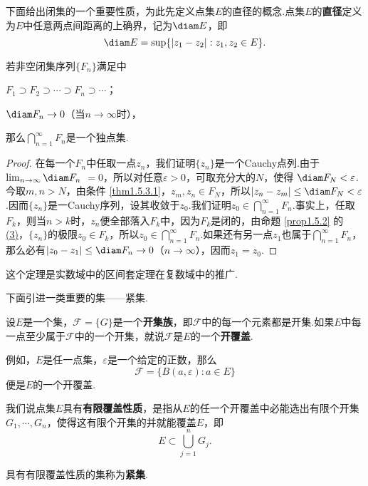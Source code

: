 下面给出闭集的一个重要性质，为此先定义点集$E$的直径的概念.点集$E$的\textbf{直径}定义为$E$中任意两点间距离的上确界，记为$\diam E$，即
\[\diam E=\sup\{|z_1-z_2|:z_1,z_2\in E\}.\]

\begin{theorem}\label{thm1.5.3}
  若非空闭集序列$\{F_n\}$满足中
  \begin{eenum}
    \item \label{thm1.5.3.1} $F_1\supset F_2\supset\cdots\supset F_n\supset\cdots$；
    \item \label{thm1.5.3.2} $\diam F_n\to 0$（当$n\to\infty$时），
  \end{eenum}
  那么$\bigcap_{n=1}^\infty F_n$是一个独点集.
\end{theorem}
\begin{proof}
在每一个$F_n$中任取一点$z_n$，我们证明$\{z_n\}$是一个Cauchy点列.由于$\lim_{n\to\infty}\diam F_n$ $=0$，所以对任意$\varepsilon>0$，可取充分大的$N$，使得 $\diam F_N<\varepsilon$.今取$m,n>N$，由条件 \ref{thm1.5.3.1}，$z_m,z_n\in F_N$，所以$|z_n-z_m|\le\diam F_N<\varepsilon$.因而$\{z_n\}$是一Cauchy序列，设其收敛于$z_0$.我们证明$z_0\in\bigcap_{n=1}^\infty F_n$.事实上，任取$F_k$，则当$n>k$时，$z_n$便全部落入$F_k$中，因为$F_k$是闭的，由命题 \ref{prop1.5.2} 的 \hyperlink{prop1.5.2.3}{(3)}，$\{z_n\}$的极限$z_0\in F_k$，所以$z_0\in\bigcap_{n=1}^\infty F_n$.如果还有另一点$z_1$也属于$\bigcap_{n=1}^\infty F_n$，那么必有$|z_0-z_1|\le\diam F_n\to0$（$n\to\infty$），因而$z_1=z_0$.
\end{proof}

这个定理是实数域中的区间套定理在复数域中的推广.

下面引进一类重要的集——紧集.

设$E$是一个集，$\mathscr F=\{G\}$是一个\textbf{开集族}，即$\mathscr F$中的每一个元素都是开集.如果$E$中每一点至少属于$\mathscr F$中的一个开集，就说$\mathscr F$是$E$的一个\textbf{开覆盖}.

例如，$E$是任一点集，$\varepsilon$是一个给定的正数，那么
\[\mathscr F=\{B(a,\varepsilon):a\in E\}\]
便是$E$的一个开覆盖.

我们说点集$E$具有\textbf{有限覆盖性质}，是指从$E$的任一个开覆盖中必能选出有限个开集$G_1,\cdots,G_n$，使得这有限个开集的并就能覆盖$E$，即
\[E\subset\bigcup_{j=1}^nG_j.\]
\begin{definition}\label{def1.5.4}
具有有限覆盖性质的集称为\textbf{紧集}.
\end{definition}

